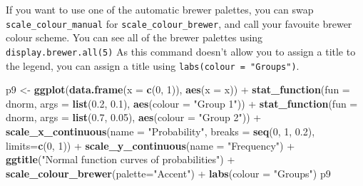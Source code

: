 \documentclass[]{article}
\newenvironment{Shaded}{\begin{snugshade}}{\end{snugshade}}
\newcommand{\KeywordTok}[1]{\textcolor[rgb]{0.13,0.29,0.53}{\textbf{{#1}}}}
\newcommand{\DataTypeTok}[1]{\textcolor[rgb]{0.13,0.29,0.53}{{#1}}}
\newcommand{\DecValTok}[1]{\textcolor[rgb]{0.00,0.00,0.81}{{#1}}}
\newcommand{\FloatTok}[1]{\textcolor[rgb]{0.00,0.00,0.81}{{#1}}}
\newcommand{\StringTok}[1]{\textcolor[rgb]{0.31,0.60,0.02}{{#1}}}
\newcommand{\NormalTok}[1]{{#1}}
\begin{document}
If you want to use one of the automatic brewer palettes, you can swap
\texttt{scale\_colour\_manual} for \texttt{scale\_colour\_brewer}, and
call your favouite brewer colour scheme. You can see all of the brewer
palettes using \texttt{display.brewer.all(5)} As this command doesn't
allow you to assign a title to the legend, you can assign a title using
\texttt{labs(colour\ =\ "Groups")}.

\begin{Shaded}
\begin{Highlighting}[]
\NormalTok{p9 <-}\StringTok{ }\KeywordTok{ggplot}\NormalTok{(}\KeywordTok{data.frame}\NormalTok{(}\DataTypeTok{x =} \KeywordTok{c}\NormalTok{(}\DecValTok{0}\NormalTok{, }\DecValTok{1}\NormalTok{)), }\KeywordTok{aes}\NormalTok{(}\DataTypeTok{x =} \NormalTok{x)) +}
\StringTok{        }\KeywordTok{stat_function}\NormalTok{(}\DataTypeTok{fun =} \NormalTok{dnorm, }\DataTypeTok{args =} \KeywordTok{list}\NormalTok{(}\FloatTok{0.2}\NormalTok{, }\FloatTok{0.1}\NormalTok{),}
                      \KeywordTok{aes}\NormalTok{(}\DataTypeTok{colour =} \StringTok{"Group 1"}\NormalTok{)) +}
\StringTok{        }\KeywordTok{stat_function}\NormalTok{(}\DataTypeTok{fun =} \NormalTok{dnorm, }\DataTypeTok{args =} \KeywordTok{list}\NormalTok{(}\FloatTok{0.7}\NormalTok{, }\FloatTok{0.05}\NormalTok{),}
                      \KeywordTok{aes}\NormalTok{(}\DataTypeTok{colour =} \StringTok{"Group 2"}\NormalTok{)) +}
\StringTok{        }\KeywordTok{scale_x_continuous}\NormalTok{(}\DataTypeTok{name =} \StringTok{"Probability"}\NormalTok{,}
                              \DataTypeTok{breaks =} \KeywordTok{seq}\NormalTok{(}\DecValTok{0}\NormalTok{, }\DecValTok{1}\NormalTok{, }\FloatTok{0.2}\NormalTok{),}
                              \DataTypeTok{limits=}\KeywordTok{c}\NormalTok{(}\DecValTok{0}\NormalTok{, }\DecValTok{1}\NormalTok{)) +}
\StringTok{        }\KeywordTok{scale_y_continuous}\NormalTok{(}\DataTypeTok{name =} \StringTok{"Frequency"}\NormalTok{) +}
\StringTok{        }\KeywordTok{ggtitle}\NormalTok{(}\StringTok{"Normal function curves of probabilities"}\NormalTok{) +}
\StringTok{        }\KeywordTok{scale_colour_brewer}\NormalTok{(}\DataTypeTok{palette=}\StringTok{"Accent"}\NormalTok{) +}
\StringTok{        }\KeywordTok{labs}\NormalTok{(}\DataTypeTok{colour =} \StringTok{"Groups"}\NormalTok{)}
\NormalTok{p9}
\end{Highlighting}
\end{Shaded}
\end{document}
